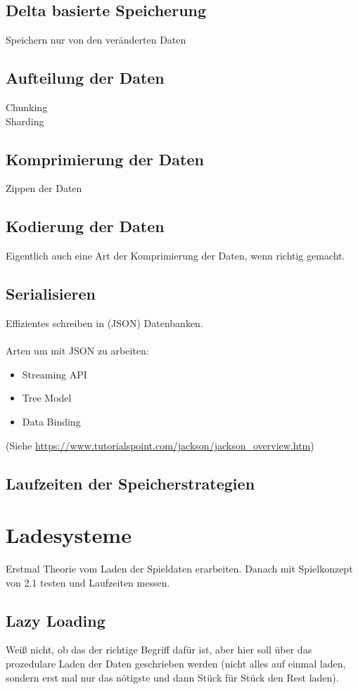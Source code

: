 \subsection{Delta basierte Speicherung}
Speichern nur von den veränderten Daten

\subsection{Aufteilung der Daten}
Chunking\\
Sharding

\subsection{Komprimierung der Daten}
Zippen der Daten

\subsection{Kodierung der Daten}
Eigentlich auch eine Art der Komprimierung der Daten, wenn richtig gemacht. 

\subsection{Serialisieren}
Effizientes schreiben in (JSON) Datenbanken.\\\\
Arten um mit JSON zu arbeiten:
\begin{itemize}
    \item Streaming API
    \item Tree Model
    \item Data Binding
\end{itemize}
(Siehe \url{https://www.tutorialspoint.com/jackson/jackson_overview.htm})

\subsection{Laufzeiten der Speicherstrategien}

\section{Ladesysteme}
Erstmal Theorie vom Laden der Spieldaten erarbeiten. Danach mit Spielkonzept
von 2.1 testen und Laufzeiten messen.

\subsection{Lazy Loading}
Weiß nicht, ob das der richtige Begriff dafür ist, aber hier soll über das prozedulare 
Laden der Daten geschrieben werden (nicht alles auf einmal laden, sondern erst mal nur das
nötigste und dann Stück für Stück den Rest laden). 


